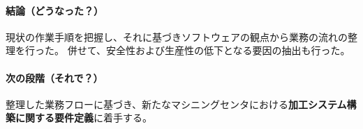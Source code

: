 {\paragraph*{結論（どうなった？）}
現状の作業手順を把握し、それに基づきソフトウェアの観点から業務の流れの整理を行った。
併せて、安全性および生産性の低下となる要因の抽出も行った。
\tcbline*
\paragraph*{次の段階（それで？）}
整理した業務フローに基づき、新たなマシニングセンタにおける\textbf{加工システム構築に関する要件定義}に着手する。
}





\clearrightpage
\begin{appendices}
\end{appendices}

\clearrightpage
